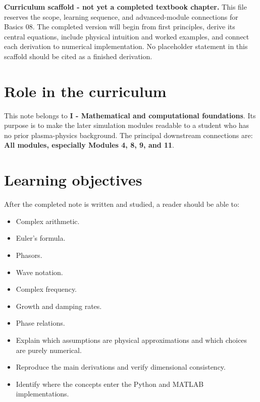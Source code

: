 \documentclass[11pt]{article}
\begin{document}

\begin{overviewbox}
\textbf{Curriculum scaffold - not yet a completed textbook chapter.} This file reserves the scope, learning sequence, and advanced-module connections for Basics 08. The completed version will begin from first principles, derive its central equations, include physical intuition and worked examples, and connect each derivation to numerical implementation. No placeholder statement in this scaffold should be cited as a finished derivation.
\end{overviewbox}

\ProjectTOC

\section{Role in the curriculum}
This note belongs to \textbf{I - Mathematical and computational foundations}. Its purpose is to make the later simulation modules readable to a student who has no prior plasma-physics background. The principal downstream connections are: \textbf{All modules, especially Modules 4, 8, 9, and 11}.

\section{Learning objectives}
After the completed note is written and studied, a reader should be able to:
\begin{itemize}[leftmargin=1.6em]
\item Complex arithmetic.
\item Euler's formula.
\item Phasors.
\item Wave notation.
\item Complex frequency.
\item Growth and damping rates.
\item Phase relations.
\item Explain which assumptions are physical approximations and which choices are purely numerical.
\item Reproduce the main derivations and verify dimensional consistency.
\item Identify where the concepts enter the Python and MATLAB implementations.
\end{itemize}
\end{document}
